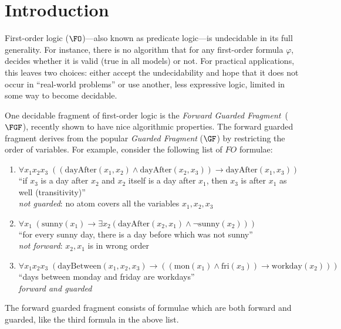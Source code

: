 \chapter{Introduction}\label{chap:introduction}

First-order logic ($\FO$)---also known as predicate logic---is undecidable in its full generality\cite[Sec. 1.1]{borger1997}.
For instance, there is no algorithm that for any first-order formula $\varphi$, decides whether it is valid (true in all models) or not.
For practical applications, this leaves two choices: either accept the undecidability and hope that it does not occur in ``real-world problems'' or use another, less expressive logic, limited in some way to become decidable.

One decidable fragment of first-order logic is the \emph{Forward Guarded Fragment}~($\FGF$), recently shown to have nice algorithmic properties\cite{Bednarczyk21}.
The forward guarded fragment derives from the popular \emph{Guarded Fragment} ($\GF$) by restricting the order of variables.
For example, consider the following list of $FO$ formulae:
\begin{enumerate}
  \item $\forall{x_{1}x_{2}x_{3}}\; ((\mathrm{dayAfter}(x_{1},x_{2}) \land \mathrm{dayAfter}(x_{2},x_{3})) \to \mathrm{dayAfter}(x_{1}, x_{3}))$ \\
        ``if $x_{3}$ is a day after $x_{2}$ and $x_{2}$ itself is a day after $x_{1}$, then $x_{3}$ is after $x_{1}$ as well (transitivity)'' \\
        \emph{not guarded}: no atom covers all the variables $x_{1}, x_{2}, x_{3}$
  \item $\forall{x_{1}}\; (\mathrm{sunny}(x_{1}) \to \exists{x_{2}} (\mathrm{dayAfter}(x_{2},x_{1}) \land \neg \mathrm{sunny}(x_{2})))$ \\
        ``for every sunny day, there is a day before which was not sunny'' \\
        \emph{not forward}: $x_{2}, x_{1}$ is in wrong order
  \item $\forall{x_{1}x_{2}x_{3}}\; (\mathrm{dayBetween}(x_{1},x_{2},x_{3}) \to ((\mathrm{mon}(x_{1}) \land \mathrm{fri}(x_{3})) \to \mathrm{workday}(x_{2})))$ \\
        ``days between monday and friday are workdays'' \\
        \emph{forward and guarded}
\end{enumerate}
The forward guarded fragment consists of formulae which are both forward and guarded, like the third formula in the above list.
